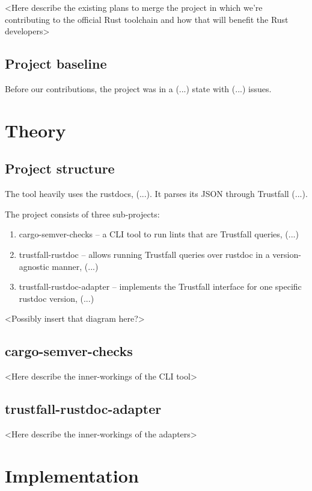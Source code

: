 \documentclass[licencjacka,en]{pracamgr}
\begin{document}
<Here describe the existing plans to merge the project in which we're contributing
to the official Rust toolchain and how that will benefit the Rust developers>


\section{Project baseline}

Before our contributions, the project was in a (...) state
with (...) issues.



\chapter{Theory}\label{r:theory}

\section{Project structure}

The tool heavily uses the rustdocs, (...).
It parses its JSON through Trustfall (...).

The project consists of three sub-projects:
\begin{enumerate}
	\item cargo-semver-checks -- a CLI tool to run lints that are Trustfall queries, (...)
	\item trustfall-rustdoc -- allows running Trustfall queries over rustdoc in a version-agnostic manner, (...)
	\item trustfall-rustdoc-adapter -- implements the Trustfall interface for one specific rustdoc version, (...)
\end{enumerate}

<Possibly insert that diagram here?>


\section{cargo-semver-checks}

<Here describe the inner-workings of the CLI tool>


\section{trustfall-rustdoc-adapter}

<Here describe the inner-workings of the adapters>



\chapter{Implementation}\label{r:implementation}
\end{document}

